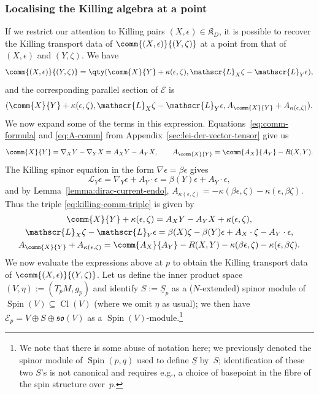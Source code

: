 \documentclass[10pt,a4paper]{amsart}
\numberwithin{equation}{section}
\newcommand{\fso}{\mathfrak{so}}
\newcommand{\fK}{\mathfrak{K}}
\newcommand{\eE}{\mathscr{E}}
\newcommand{\eL}{\mathscr{L}}
\newcommand{\Sbundle}{\underline{S}}
\newcommand{\1}{\mathbbm{1}}
\DeclareMathOperator{\Spin}{Spin}
\DeclareMathOperator{\Cl}{Cl}
\begin{document}
\subsubsection{Localising the Killing algebra at a point}

If we restrict our attention to Killing pairs $(X,\epsilon)\in\fK_D$, it is possible to recover the Killing transport data of $\comm{(X,\epsilon)}{(Y,\zeta)}$ at a point from that of $(X,\epsilon)$ and $(Y,\zeta)$. We have
\[
	\comm{(X,\epsilon)}{(Y,\zeta)} = \qty(\comm{X}{Y} + \kappa(\epsilon,\zeta),\eL_X\zeta - \eL_Y\epsilon),
\]
and the corresponding parallel section of $\eE$ is
\begin{equation}\label{eq:killing-comm-triple}
	(\comm{X}{Y} + \kappa(\epsilon,\zeta),\eL_X\zeta - \eL_Y\epsilon,A_{\comm{X}{Y}} + A_{\kappa(\epsilon,\zeta)}).
\end{equation}
We now expand some of the terms in this expression. Equations~\eqref{eq:comm-formula} and \eqref{eq:A-comm} from Appendix~\ref{sec:lei-der-vector-tensor} give us
\[
	\comm{X}{Y} = \nabla_X Y - \nabla_Y X = A_X Y - A_Y X,\qquad
	A_{\comm{X}{Y}} = \comm{A_X}{A_Y} - R(X,Y).
\]
The Killing spinor equation in the form $\nabla \epsilon = \beta\epsilon$ gives
\[
	\eL_Y\epsilon = \nabla_Y\epsilon + A_Y\cdot\epsilon = \beta(Y)\epsilon + A_Y\cdot\epsilon,
\]
and by Lemma~\ref{lemma:dirac-current-endo},
$
	A_{\kappa(\epsilon,\zeta)} = - \kappa(\beta\epsilon,\zeta) - \kappa(\epsilon,\beta\zeta)$.
Thus the triple \eqref{eq:killing-comm-triple} is given by
\begin{gather*}
	\comm{X}{Y} + \kappa(\epsilon,\zeta) = A_X Y - A_Y X + \kappa(\epsilon,\zeta),\\
	\eL_X\zeta - \eL_Y\epsilon = \beta(X)\zeta - \beta(Y)\epsilon + A_X\cdot\zeta - A_Y\cdot\epsilon,\\
	A_{\comm{X}{Y}} + A_{\kappa(\epsilon,\zeta)} = \comm{A_X}{A_Y} - R(X,Y) - \kappa(\beta\epsilon,\zeta) - \kappa(\epsilon,\beta\zeta).
\end{gather*}
We now evaluate the expressions above at $p$ to obtain the Killing transport data of $\comm{(X,\epsilon)}{(Y,\zeta)}$. Let us define the inner product space $(V,\eta):=(T_pM,g_p)$ and identify $S:=\Sbundle_p$ as a ($N$-extended) spinor module of $\Spin(V)\subseteq\Cl(V)$ (where we omit $\eta$ as usual); we then have $\eE_p = V\oplus S\oplus\fso(V)$ as a $\Spin(V)$-module.\footnote{We note that there is some abuse of notation here; we previously denoted the spinor module of $\Spin(p,q)$ used to define $\Sbundle$ by~$S$; identification of these two $S$'s is not canonical and requires e.g., a choice of basepoint in the fibre of the spin structure over~$p$.}
\end{document}
